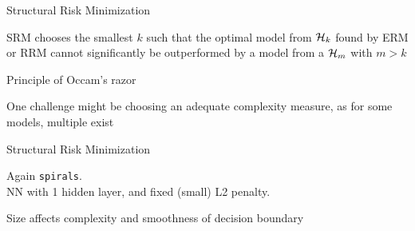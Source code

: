 \documentclass[11pt,compress,t,notes=noshow, xcolor=table]{beamer}
\begin{document}
\begin{framei}[sep=M]{Structural Risk Minimization}

  \item SRM chooses the smallest $k$ such that the optimal model from $\mathcal{H}_k$ found by ERM or RRM cannot significantly
        be outperformed by a model from a $\mathcal{H}_m$ with $m > k$
  \item Principle of Occam's razor
  \item One challenge might be choosing an adequate complexity measure, as for some models, multiple exist



\end{framei}

\begin{frame} {Structural Risk Minimization}

{\small
Again \texttt{spirals}.\\
NN with 1 hidden layer, and fixed (small) L2 penalty.}

\vfill




{\small
Size affects complexity and smoothness of decision boundary}


\end{frame}
\end{document}
